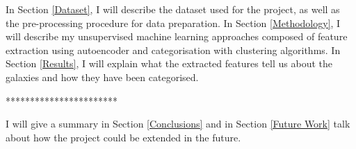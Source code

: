 \documentclass[12pt, onecolumn]{article}
\begin{document}
        In Section \ref{Dataset}, I will describe the dataset used for the project, as well as the pre-processing procedure for data preparation. In Section \ref{Methodology}, I will describe my unsupervised machine learning approaches composed of feature extraction using autoencoder and categorisation with clustering algorithms. In Section \ref{Results}, I will explain what the extracted features tell us about the galaxies and how they have been categorised. 

        \vspace{5mm}
        ***********************
        
        I will give a summary in Section \ref{Conclusions} and in Section \ref{Future Work} talk about how the project could be extended in the future.

    
    




    
\end{document}
